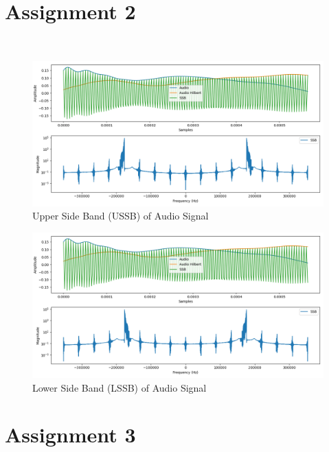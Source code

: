 \documentclass[
	letterpaper, %
	10pt, %
]{CSUniSchoolLabReport}
\begin{document}
\section{Assignment 2}


\begin{lstlisting}[language=Python]
	

\end{lstlisting}

\begin{figure}[H] %
	\centering %
	\includegraphics[width=1.2\textwidth]{assignment2a.png} %
	\caption{Upper Side Band (USSB) of Audio Signal}
	\label{fig:block}
\end{figure}

\begin{figure}[H] %
	\centering %
	\includegraphics[width=1.2\textwidth]{assignment2b.png} %
	\caption{Lower Side Band (LSSB) of Audio Signal}
	\label{fig:block}
\end{figure}

\section{Assignment 3}
\end{document}
